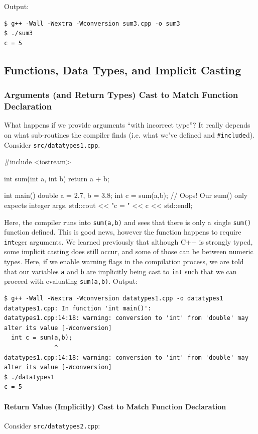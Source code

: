 \documentclass[12pt,letterpaper,twoside]{article}
\begin{document}
Output:

\begin{verbatim}
$ g++ -Wall -Wextra -Wconversion sum3.cpp -o sum3
$ ./sum3
c = 5
\end{verbatim}

\subsection{Functions, Data Types, and Implicit Casting}
\subsubsection{Arguments (and Return Types) Cast to Match Function Declaration}
What happens if we provide arguments ``with incorrect type''? It really depends on what sub-routines the compiler finds (i.e. what we've defined and \texttt{\#include}d).
Consider \texttt{src/datatypes1.cpp}.

\begin{cpp}
#include <iostream>

int sum(int a, int b) {
  return a + b;
}

int main() {
  double a = 2.7, b = 3.8;
  int c = sum(a,b);   // Oops! Our sum() only expects integer args.
  std::cout << "c = " << c << std::endl;
}
\end{cpp}

Here, the compiler runs into \texttt{sum(a,b)} and sees that there is only a single 
\texttt{sum()} function defined. This is good news, however the function happens to require
\texttt{int}eger arguments. We learned previously that although C++ is strongly typed,
some implicit casting does still occur, and some of those can be between numeric types.
Here, if we enable warning flags in the compilation process, we are told that our variables \texttt{a} and \texttt{b} are implicitly being cast to \texttt{int} such that we can
proceed with evaluating \texttt{sum(a,b)}. Output:

{\small
\begin{verbatim}
$ g++ -Wall -Wextra -Wconversion datatypes1.cpp -o datatypes1
datatypes1.cpp: In function 'int main()':
datatypes1.cpp:14:18: warning: conversion to 'int' from 'double' may alter its value [-Wconversion]
  int c = sum(a,b);
              ^
datatypes1.cpp:14:18: warning: conversion to 'int' from 'double' may alter its value [-Wconversion]
$ ./datatypes1
c = 5
\end{verbatim}
}

\paragraph{Return Value (Implicitly) Cast to Match Function Declaration}
Consider \texttt{src/datatypes2.cpp}:
\end{document}
